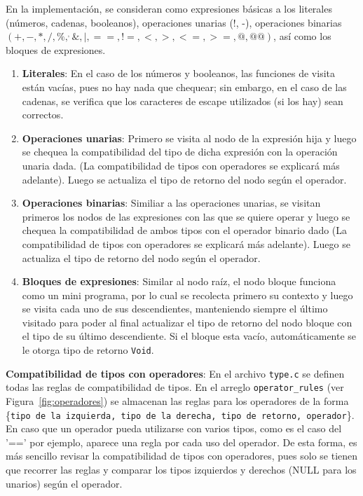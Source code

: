 \documentclass{llncs}
\begin{document}
En la implementación, se consideran como expresiones básicas a los literales (números, cadenas, booleanos), operaciones unarias (!, -), 
operaciones binarias $(+, -, *, /, \%, ^, \&, |, ==, !=, <, >, <=, >=, @, @@)$, así como los bloques de expresiones.
\begin{enumerate}
    \item \textbf{Literales}: En el caso de los números y booleanos, las funciones de visita están vacías, pues no hay nada que chequear; sin embargo,
    en el caso de las cadenas, se verifica que los caracteres de escape utilizados (si los hay) sean correctos.
    \item \textbf{Operaciones unarias}: Primero se visita al nodo de la expresión hija y luego se chequea la compatibilidad del tipo de dicha expresión con
    la operación unaria dada. (La compatibilidad de tipos con operadores se explicará más adelante). Luego se actualiza el tipo de retorno del nodo según el operador.
    \item \textbf{Operaciones binarias}: Similiar a las operaciones unarias, se visitan primeros los nodos de las expresiones con las que se quiere operar y luego 
    se chequea la compatibilidad de ambos tipos con el operador binario dado (La compatibilidad de tipos con operadores se explicará más adelante). Luego se actualiza el tipo 
    de retorno del nodo según el operador.
    \item \textbf{Bloques de expresiones}: Similar al nodo raíz, el nodo bloque funciona como un mini programa, por lo cual se recolecta primero su contexto y luego se visita cada uno de sus 
    descendientes, manteniendo siempre el último visitado para poder al final actualizar el tipo de retorno del nodo bloque con el tipo de su último descendiente. Si el bloque esta vacío, automáticamente 
    se le otorga tipo de retorno \texttt{Void}.
\end{enumerate}

\textbf{Compatibilidad de tipos con operadores}: En el archivo \texttt{type.c} se definen todas las reglas de compatibilidad de tipos. En el arreglo \texttt{operator\_rules} (ver Figura~\ref{fig:operadores}) se almacenan las reglas para los 
operadores de la forma \{\texttt{tipo de la izquierda, tipo de la derecha, tipo de retorno, operador}\}. En caso que un operador pueda utilizarse con varios tipos, como es el caso del '==' por ejemplo, aparece una regla por cada
uso del operador. De esta forma, es más sencillo revisar la compatibilidad de tipos con operadores, pues solo se tienen que recorrer las reglas y comparar los tipos izquierdos y derechos (NULL para los unarios) según el operador.
\end{document}
